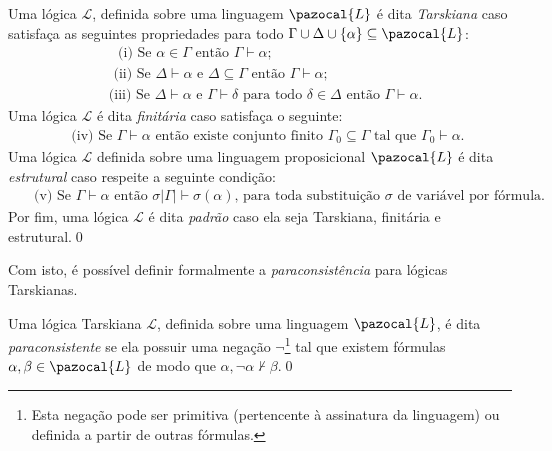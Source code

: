 \begin{definicao}
    \label{def:padrao}
    Uma lógica $\mathcal{L}$, definida sobre uma linguagem $\pazocal{L}$ é dita \textit{Tarskiana} caso satisfaça as seguintes propriedades para todo $\Gamma \cup \Delta \cup \{\alpha\} \subseteq \pazocal{L}$:
    \begin{align*}
         & \text{~~(i) Se } \alpha \in \Gamma \text{ então } \Gamma \vdash \alpha;                                                                       \\
         & \text{~(ii) Se } \Delta \vdash \alpha \text{ e } \Delta \subseteq \Gamma \text{ então } \Gamma \vdash \alpha;                                 \\
         & \text{(iii) Se } \Delta \vdash \alpha \text{ e } \Gamma \vdash \delta \text{ para todo } \delta \in \Delta \text{ então } \Gamma \vdash \alpha.
    \end{align*}
    Uma lógica $\mathcal{L}$ é dita \textit{finitária} caso satisfaça o seguinte:
    \begin{align*}
         & \text{~(iv) Se } \Gamma \vdash \alpha \text{ então existe conjunto finito } \Gamma_{0} \subseteq \Gamma \text{ tal que } \Gamma_{0} \vdash \alpha.
    \end{align*}
    Uma lógica $\mathcal{L}$ definida sobre uma linguagem proposicional $\pazocal{L}$ é dita \textit{estrutural} caso respeite a seguinte condição:
    \begin{align*}
         & \text{~~(v) Se } \Gamma \vdash \alpha \text{ então } \sigma |\Gamma| \vdash \sigma(\alpha) \text{, para toda substituição } \sigma \text{ de variável por fórmula.}
    \end{align*}
    Por fim, uma lógica $\mathcal{L}$ é dita \textit{padrão} caso ela seja Tarskiana, finitária e estrutural.\qed{}
\end{definicao}
Com isto, é possível definir formalmente a \textit{paraconsistência} para lógicas Tarskianas.

\begin{definicao}
    \label{def:tarskiana_paracons}
    Uma lógica Tarskiana $\mathcal{L}$, definida sobre uma linguagem $\pazocal{L}$, é dita \textit{paraconsistente} se ela possuir uma negação $\neg$\footnote{Esta negação pode ser primitiva (pertencente à assinatura da linguagem) ou definida a partir de outras fórmulas.} tal que existem fórmulas $\alpha, \beta \in \pazocal{L}$ de modo que $\alpha, \neg \alpha \nvdash \beta$.\qed{}
\end{definicao}

